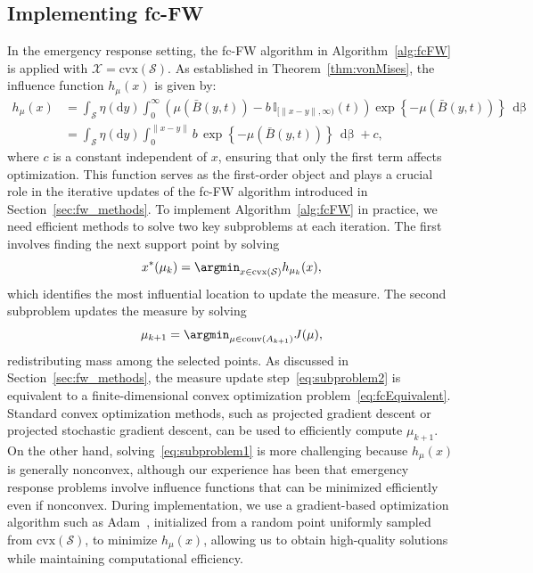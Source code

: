 \documentclass[stsy,sglanonrev]{informs4}
\newcommand{\death}{{\beta}}
\begin{document}
\subsection{Implementing fc-FW}
In the emergency response setting, the fc-FW algorithm in Algorithm~\ref{alg:fcFW} is applied with $\mathcal{X} = \mathrm{cvx}(\mathcal{S})$. As established in Theorem~\ref{thm:vonMises}, the influence function \( h_{\mu}(x) \) is given by:
\begin{align}
    h_{\mu}(x) &= \int_{\mathcal{S}} \eta(\mbox{d}y) \int_0^{\infty} \left(\mu\left(\bar{B}(y,t) \right) - b \, \mathbb{I}_{[\|x-y \|,\infty)}(t)\right) \exp\left\{-\mu\left(\bar{B}(y,t) \right) \right\} \, \mathop{d\death(t)} \nonumber\\
    & =\int_{\mathcal{S}} \eta(\mbox{d}y) \int_0^{\|x-y \|}  b\,\exp\left\{-\mu\left(\bar{B}(y,t) \right) \right\} \, \mathop{d\death(t)} + c,
\end{align} where \( c \) is a constant independent of \( x \), ensuring that only the first term affects optimization. This function serves as the first-order object and plays a crucial role in the iterative updates of the fc-FW algorithm introduced in Section~\ref{sec:fw_methods}. To implement Algorithm~\ref{alg:fcFW} in practice, we need efficient methods to solve two key subproblems at each iteration. The first involves finding the next support point by solving
\begin{equation} \label{eq:subproblem1} x^*(\mu_k) = \argmin_{x\in \mathrm{cvx}(\mathcal{S})} h_{\mu_k}(x), \end{equation}
which identifies the most influential location to update the measure. The second subproblem updates the measure by solving
\begin{equation} \label{eq:subproblem2} \mu_{k+1} = \argmin_{\mu\in \mathrm{conv}(A_{k+1})} J(\mu), \end{equation}
redistributing mass among the selected points. As discussed in Section~\ref{sec:fw_methods}, the measure update step~\eqref{eq:subproblem2} is equivalent to a finite-dimensional convex optimization problem~\eqref{eq:fcEquivalent}. Standard convex optimization methods, such as projected gradient descent or projected stochastic gradient descent, can be used to efficiently compute \( \mu_{k+1} \). On the other hand, solving~\eqref{eq:subproblem1} is more challenging because \( h_{\mu}(x) \) is generally nonconvex, although our experience has been that emergency response problems involve influence functions that can be minimized efficiently even if nonconvex. During implementation, we use a gradient-based optimization algorithm such as Adam~\cite{kingma2017adam}, initialized from a random point uniformly sampled from $\mathrm{cvx}(\mathcal{S})$, to minimize \( h_{\mu}(x) \), allowing us to obtain high-quality solutions while maintaining computational efficiency.
\end{document}
